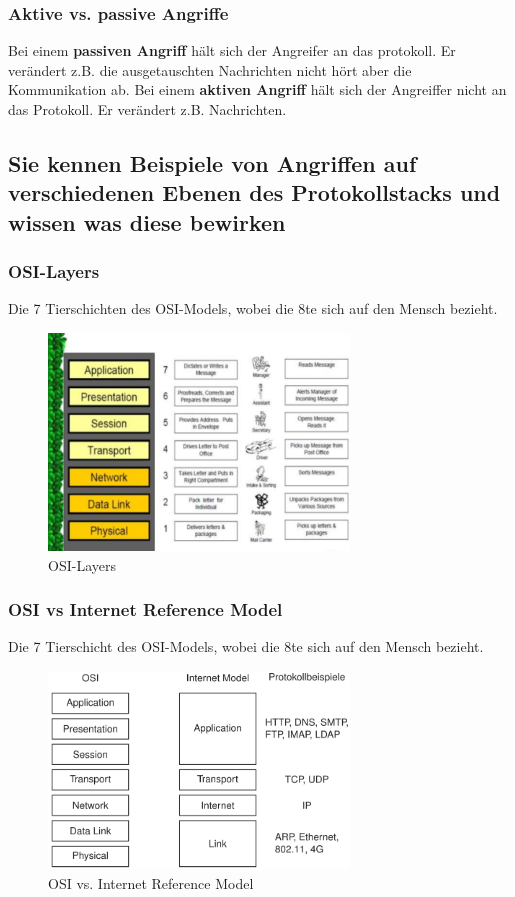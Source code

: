 \documentclass[10pt,a4paper]{article}
\begin{document}
\subsubsection*{Aktive vs. passive Angriffe}
Bei einem \textbf{passiven Angriff} hält sich der Angreifer an das protokoll. Er verändert z.B. die ausgetauschten Nachrichten nicht hört aber die Kommunikation ab.
Bei einem \textbf{aktiven Angriff} hält sich der Angreiffer nicht an das Protokoll. Er verändert z.B. Nachrichten.

\subsection*{Sie kennen Beispiele von Angriffen auf verschiedenen Ebenen des Protokollstacks und wissen was diese bewirken}

\subsubsection*{OSI-Layers}
Die 7 Tierschichten des OSI-Models, wobei die 8te sich auf den Mensch bezieht.

\begin{figure}[H]
    \begin{center}
    \includegraphics[width=8cm]{images/OSI-Layers.png}
    \caption{OSI-Layers}
    \label{OSI-Layers}
    \end{center}
\end{figure}

\subsubsection*{OSI vs Internet Reference Model}
Die 7 Tierschicht des OSI-Models, wobei die 8te sich auf den Mensch bezieht.

\begin{figure}[H]
    \begin{center}
    \includegraphics[width=8cm]{images/OSIvsIRM.png}
    \caption{OSI vs. Internet Reference Model}
    \label{OSIvsIRM}
    \end{center}
\end{figure}
\end{document}
